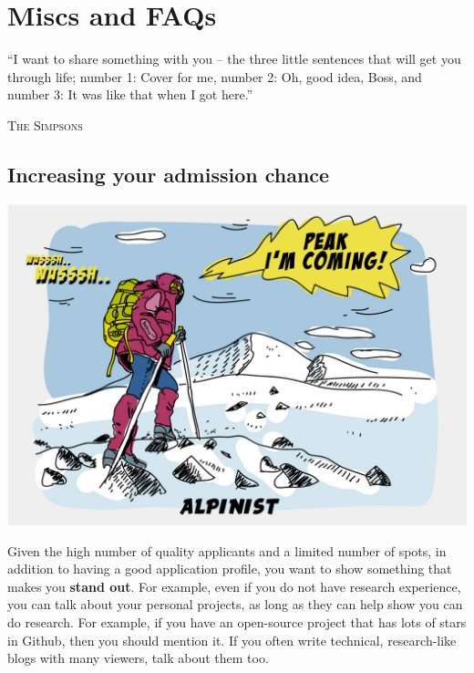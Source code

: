\documentclass[oneside,11pt,dvipsnames]{book}
\def\sectioninfo#1{%
  \addcontentsline{toc}{sectioninfo}{%
    \noexpand\numberline{}\color{black}{#1}}%
}
\begin{document}
\chapter{Miscs and FAQs}\label{sec:faqs}

\epigraph{``I want to share something with you – the three little sentences that will get you through life; number 1: Cover for me, number 2: Oh, good idea, Boss, and number 3: It was like that when I got here.''}{\textsc{The Simpsons}}

\section{Increasing your admission chance}\label{sec:improve-your-chance}

\sectioninfo{Increasing admission chance by being unique and standing out.}

\begin{center}
  \includegraphics[scale=0.2]{files/alpinist-climbing-peak-mountain-comic-hand-drawn-vector-illustration.jpg}
\end{center}


Given the high number of quality applicants and a limited number of spots, in addition to having a good application profile, you want to show something that makes you \textbf{stand out}.  For example, even if you do not have research experience, you can talk about your personal projects, as long as they can help show you can do research. For example, if you have an open-source project that has lots of stars in Github, then you should mention it. If you often write technical, research-like blogs with many viewers, talk about them too.
\end{document}
